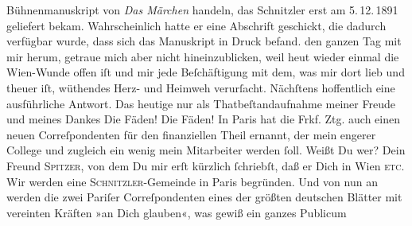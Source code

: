 \begin{ledgroupsized}[t]{13cm}
{{{                  Bühnenmanuskript von \emph{Das Märchen} handeln, das
                     Schnitzler erst am 5. 12. 1891 geliefert
                  bekam. Wahrscheinlich hatte er eine Abschrift geschickt, die dadurch verfügbar
                  wurde, dass sich das Manuskript in Druck befand.}}}\label{K_L02671-1h} den ganzen Tag mit mir
               herum, getraue mich aber nicht hineinzublicken, weil heut wieder einmal die Wien-Wunde offen iſt und mir jede Beſchäftigung mit dem, was mir dort lieb
               und theuer iſt, wüthendes Herz- und Heimweh verurſacht. Nächſtens hoffentlich eine
               ausführliche Antwort. Das heutige nur als Thatbeſtandaufnahme meiner Freude und
               meines Dankes{\dotsfour}\pend
           \pstart
           Die Fäden! Die Fäden! In Paris hat die Frkf. Ztg. auch {\pb}einen neuen Correſpondenten für den finanziellen Theil ernannt, der mein engerer College\strikeout{\textcolor{gray}{w}} und zugleich ein wenig mein Mitarbeiter werden ſoll. Weißt Du wer? Dein Freund \textsc{Spitzer}, von dem Du mir erſt kürzlich ſchriebſt, daß er Dich in Wien\label{K_L02671-2v}\label{K_L02671-2h}{ }\textsc{etc}. Wir werden eine \textsc{Schnitzler}-Gemeinde in \strikeout{\textcolor{gray}{Wi}}{ }Paris begründen. Und von nun an werden die zwei
                  Pariſer Correſpondenten eines der größten deutschen Blätter mit vereinten Kräften »an Dich glauben«, was gewiß ein ganzes Publicum

\end{ledgroupsized}
